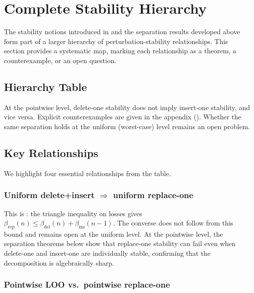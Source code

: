 \section{Complete Stability Hierarchy}
\label{sec:stability-hierarchy}

The stability notions introduced in  and the separation
results developed above form part of a larger hierarchy of perturbation-stability
relationships. This section provides a systematic map, marking each
relationship as a theorem, a counterexample, or an open question.

\subsection{Hierarchy Table}



\begin{proposition}
\label{prop:del-not-impl-ins}
\label{prop:ins-not-impl-del}
At the pointwise level, delete-one stability does not imply insert-one
stability, and vice versa. Explicit counterexamples are given in the
appendix (). Whether the same separation holds at
the uniform (worst-case) level remains an open problem.
\end{proposition}

\subsection{Key Relationships}

We highlight four essential relationships from the table.

\subsubsection{Uniform delete+insert $\Rightarrow$ uniform replace-one}

This is : the triangle inequality on losses gives
$\beta_{\mathrm{rep}}(n) \le \beta_{\mathrm{del}}(n) + \beta_{\mathrm{ins}}(n-1)$.
The converse does not follow from this bound and remains open at the uniform
level. At the pointwise level, the separation theorems below show that
replace-one stability can fail even when delete-one and insert-one are
individually stable, confirming that the decomposition is algebraically sharp.

\subsubsection{Pointwise LOO vs.\ pointwise replace-one}

